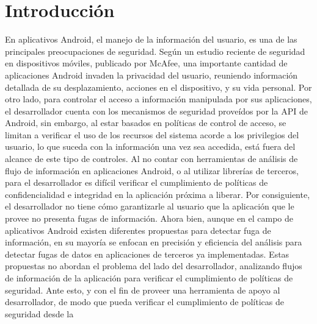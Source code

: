 \section{Introducción}
En aplicativos Android, el manejo de la información del usuario, es una de las
principales preocupaciones de seguridad. Según un estudio reciente de seguridad
en dispositivos móviles, publicado por McAfee\cite{McAfeeReport}, una importante
cantidad de aplicaciones Android invaden la privacidad del usuario, reuniendo
información detallada de su desplazamiento, acciones en el dispositivo, y su
vida personal.\newline
Por otro lado, para controlar el acceso a información manipulada por sus
aplicaciones, el desarrollador cuenta con los mecanismos de seguridad proveídos
por la API de Android, sin embargo, al estar basados en políticas de control de
acceso, se limitan a verificar el uso de los recursos del sistema acorde a los
privilegios del usuario, lo que suceda con la información una vez sea accedida,
está fuera del alcance de este tipo de controles. Al no contar con herramientas
de análisis de flujo de información en aplicaciones Android, o al utilizar
librerías de terceros, para el desarrollador es difícil verificar
el cumplimiento de políticas de confidencialidad e integridad en la aplicación
próxima a liberar. Por consiguiente, el desarrollador no tiene cómo garantizarle
al usuario que la aplicación que le provee no presenta fugas de información.\newline
Ahora bien, aunque en el campo de aplicativos Android existen diferentes
propuestas para detectar fuga de información, en su mayoría  se enfocan en precisión y
eficiencia del análisis para detectar fugas de datos en aplicaciones de terceros
ya implementadas. Estas propuestas no abordan el problema del lado del
desarrollador, analizando flujos de información de la aplicación para verificar
el cumplimiento de políticas de seguridad.\newline
Ante esto, y con el fin de proveer una herramienta de apoyo al desarrollador, de
modo que pueda verificar el cumplimiento de políticas de seguridad desde la
